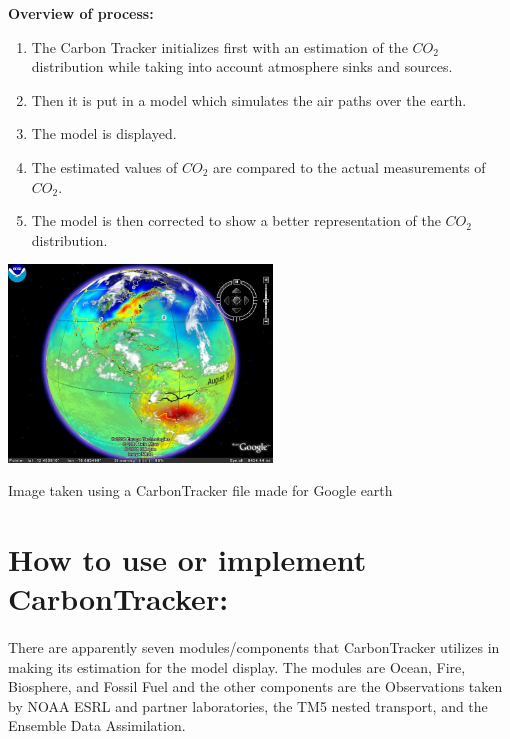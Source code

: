 \documentclass[12pt,letterpaper]{report}
\begin{document}
  \begin{center}
  \begin{minipage}{0.55\textwidth}
  \begin{flushleft}
  \ignorespaces
  {\large \textbf{Overview of process:}}
   \begin{enumerate}
	\item The Carbon Tracker initializes first
	with an estimation of the $CO_2$ distribution
	while	taking into account atmosphere sinks
	and sources.
	\item Then it is put in a model which
	simulates the air paths over the earth.
	\item The model is displayed.
	\item The estimated values of $CO_2$ are
	compared to the actual measurements of $CO_2$.
	\item The model is then corrected to show
	a better representation of the $CO_2$ distribution.
	\end{enumerate}
  \end{flushleft}
  \end{minipage}
  \begin{minipage}{7cm}
  \begin{flushright}
   \includegraphics[width=7cm]{example}
	\begin{center}
	\tiny{Image taken using a CarbonTracker file made for Google earth}
	\end{center}
  \end{flushright}
  \end{minipage}
  \end{center}
 \section*{How to use or implement CarbonTracker:}
  \paragraph{}
   There are apparently seven modules/components that CarbonTracker utilizes in making its estimation for the model display.  The modules are Ocean, Fire, Biosphere, and Fossil Fuel and the other components are the Observations taken by NOAA ESRL and partner laboratories, the TM5 nested transport, and the Ensemble Data Assimilation.
\end{document}
